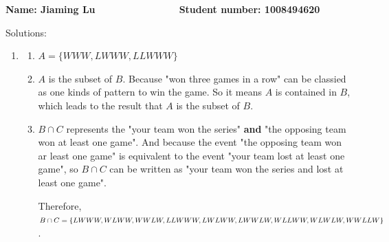 \documentclass[a4paper, 12pt]{article}
\begin{document}
\textbf{Name: Jiaming Lu $~~~~~~~~~~~~~~~~~~~~~~~~~
~~~~~~~~~~~$ Student number: 1008494620}

Solutions:

\begin{enumerate}
	\item \begin{enumerate}
		\item $A = \{WWW,LWWW,LLWWW\}$
		\item $A$ is the subset of $B$. Because "won three games in a row" can 
			be classied as one kinds of pattern to win the game. So it means
			$A$ is contained in $B$, which leads to the result that $A$ is 
			the subset of $B$.
		\item $B\cap C$ represents the "your team won the series" \textbf{and}
			"the opposing team won at least one game". And because the event 
			"the opposing team won ar least one game" is equivalent to the 
			event "your team lost at least one game", so $B \cap C$ can be 
			written as "your team won the series and lost at least one game".

			Therefore, $B \cap C = \{LWWW, WLWW, WWLW, LLWWW, LWLWW,\\ LWWLW,
			WLLWW, WLWLW, WWLLW\}$.


\end{enumerate}
\end{enumerate}
\end{document}

